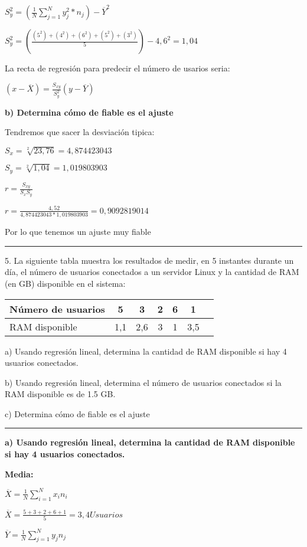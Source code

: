 \documentclass{article}
\begin{document}
\(S_{y}^2  = (\frac{1}{N} \displaystyle\sum_{j=1}^{N} y_{j} ^2 * n_{j}) - \overline{Y}^2\)

\(S_{y}^2 = (\frac{(5^2) + (4^2) + (6^2) + (5^2) + (3^2) }{5}) - 4,6^2 = 1,04\)

La recta de regresi\'on para predecir el n\'umero de usarios seria:

\((x - \overline{X}) = \frac{S_{xy}}{S_{y}^2} (y- \overline{Y})\)

\textbf{b) Determina c\'omo de fiable es el ajuste}

Tendremos que sacer la desviaci\'on tipica: 

\(S_{x} = \sqrt[2]{23,76} = 4,874423043\)

\(S_{y} = \sqrt[2]{1,04} = 1,019803903\)

\(r = \frac{S_{xy}}{S_{x} S_{y}}\)

\(r = \frac{4,52}{4,874423043 * 1,019803903} = 0,9092819014 \)

Por lo que tenemos un ajuste muy fiable

\rule{119mm}{0.5mm}

5. La siguiente tabla muestra los resultados de medir, en 5 instantes durante un d\'ia, el n\'umero de usuarios conectados a un servidor Linux y la cantidad de RAM (en GB) disponible en el sistema:

\begin{tabular}{|l|c|c|c|c|c|c|}
N\'umero de usuarios  & 5 & 3 & 2 & 6 & 1\\
\hline
RAM disponible  & 1,1 & 2,6 & 3 & 1 & 3,5\\
\end{tabular}

a) Usando regresi\'on lineal, determina la cantidad de RAM disponible si hay 4 usuarios conectados.

b) Usando regresi\'on lineal, determina el n\'umero de usuarios conectados si la RAM disponible es de 1.5 GB.

c) Determina c\'omo de fiable es el ajuste

\rule{119mm}{0.2mm}

\textbf{a) Usando regresi\'on lineal, determina la cantidad de RAM disponible si hay 4 usuarios conectados.}

\textbf{Media:}

\(\overline{X} = \frac{1}{N} \displaystyle\sum_{i=1}^{N} x_{i} n_{i}\)

\(\overline{X} = \frac{5 + 3 + 2 + 6 + 1}{5} = 3,4 Usuarios\)

\(\overline{Y} = \frac{1}{N} \displaystyle\sum_{j=1}^{N} y_{j} n_{j}\)
\end{document}
